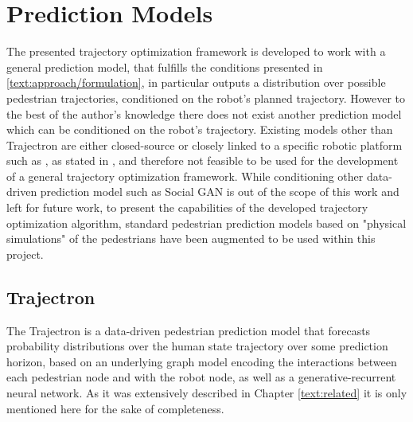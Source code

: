 \section{Prediction Models}
\label{text:experiments/environments}
The presented trajectory optimization framework is developed to work with a general prediction model, that fulfills the conditions presented in \ref{text:approach/formulation}, in particular outputs a distribution over possible pedestrian trajectories, conditioned on the robot's planned trajectory. However to the best of the author's knowledge there does not exist another prediction model which can be conditioned on the robot's trajectory. Existing models other than Trajectron \cite{Salzmann2020} are either closed-source or closely linked to a specific robotic platform such as \cite{Casas2019}\cite{Casas2018}\cite{Britz2017}\cite{Jain2019}, as stated in \cite{Salzmann2020}, and therefore not feasible to be used for the development of a general trajectory optimization framework. While conditioning other data-driven prediction model such as Social GAN \cite{Gupta2018} is out of the scope of this work and left for future work, to present the capabilities of the developed trajectory optimization algorithm, standard pedestrian prediction models based on "physical simulations" of the pedestrians have been augmented to be used within this project.

\subsection{Trajectron}
The Trajectron \cite{Ivanovic2018}\cite{Salzmann2020} is a data-driven pedestrian prediction model that forecasts probability distributions over the human state trajectory over some prediction horizon, based on an underlying graph model encoding the interactions between each pedestrian node and with the robot node, as well as a generative-recurrent neural network. As it was extensively described in Chapter \ref{text:related} it is only mentioned here for the sake of completeness. 

